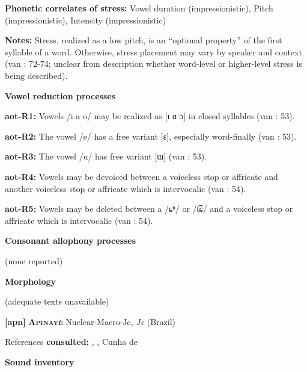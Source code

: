 \textbf{Phonetic correlates of stress:} Vowel duration (impressionistic), Pitch (impressionistic), Intensity (impressionistic)



\textbf{Notes:} Stress, realized as a low pitch, is an “optional property” of the first syllable of a word. Otherwise, stress placement may vary by speaker and context (van \citealt{Breugel2008}: 72-74; unclear from description whether word-level or higher-level stress is being described).



\textbf{Vowel reduction processes}



\textbf{aot-R1:} Vowels /i a o/ may be realized as [ɪ ɑ ɔ] in closed syllables (van \citealt{Breugel2008}: 53).



\textbf{aot-R2:} The vowel /e/ has a free variant [ɛ], especially word-finally (van \citealt{Breugel2008}: 53).



\textbf{aot-R3:} The vowel /u/ has free variant [ɯ] (van \citealt{Breugel2008}: 53).



\textbf{aot-R4:} Vowels may be devoiced between a voiceless stop or affricate and another voiceless stop or affricate which is intervocalic (van \citealt{Breugel2008}: 54).



\textbf{aot-R5:} Vowels may be deleted between a /ɕʰ/ or /t͡ɕ/ and a voiceless stop or affricate which is intervocalic (van \citealt{Breugel2008}: 54).



\textbf{Consonant allophony processes}



(none reported)



\textbf{Morphology}



(adequate texts unavailable)



\textbf{[apn]}   \textbf{\textsc{Apinayé}}  Nuclear-Macro-Je, \textit{Je} (Brazil)



References \textbf{consulted:} \citet{BurgessHam1968}, \citet{Ham2009}, Cunha de \citet{Oliveira2005}



\textbf{Sound inventory}



